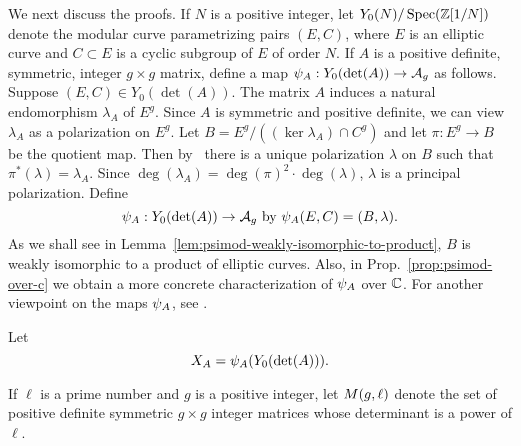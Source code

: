 \documentclass{amsart}
\begin{document}




We next discuss the proofs.
If $N$ is a positive integer, let $Y_0(N)/\operatorname{Spec}(\mathbb{Z}[1/N])$ denote the modular curve parametrizing pairs $(E, C)$, where $E$ is an elliptic curve and $C \subset E$ is a cyclic subgroup of $E$ of order $N$. If $A$ is a positive definite, symmetric, integer $g\times g$ matrix, define a map $\psi_{A}: Y_0(\det(A)) \to \mathcal{A}_g$ as follows. Suppose $(E, C) \in Y_0(\det(A))$. The matrix $A$ induces a natural endomorphism $\lambda_A$ of $E^g$. Since $A$ is symmetric and positive definite, we can view $\lambda_A$ as a polarization on $E^g$. Let $B = E^g/((\ker \lambda_A) \cap C^g)$ and let $\pi: E^g \to B$ be the quotient map. Then by~\cite[Prop.~16.8]{milne-av} there is a unique polarization $\lambda$ on $B$ such that $\pi^*(\lambda) = \lambda_A$. Since $\deg(\lambda_A) = \deg(\pi)^2 \cdot \deg(\lambda)$, $\lambda$ is a principal polarization. Define
\begin{equation}\label{def:psimoddef}
\psi_{A}: Y_0(\det(A)) \to \mathcal{A}_g  \text{ by } \psi_{A}(E,C) = (B,\lambda).
\end{equation}
As we shall see in Lemma~\ref{lem:psimod-weakly-isomorphic-to-product}, $B$ is weakly isomorphic to a product of elliptic curves. Also, in Prop.~\ref{prop:psimod-over-c} we obtain a more concrete characterization of $\psi_{A}$ over $\mathbb{C}$. For another viewpoint on the maps $\psi_{A}$, see \cite[p. 19 et seq.]{rains}.

Let
$$X_A=\psi_{A}(Y_0(\det(A))).$$

\begin{definition}\label{def:detl}
If $\ell$ is a prime number and $g$ is a positive integer, let $M(g,\ell)$ denote the set of positive definite symmetric $g \times g$ integer matrices whose determinant is a power of $\ell$.
\end{definition}
\end{document}
